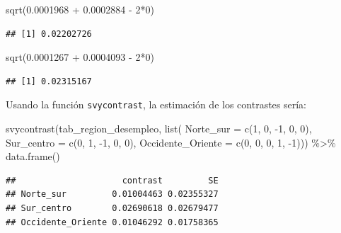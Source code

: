 \documentclass[
  12pt,
]{book}
\newenvironment{Shaded}{\begin{snugshade}}{\end{snugshade}}
\newcommand{\AttributeTok}[1]{\textcolor[rgb]{0.77,0.63,0.00}{#1}}
\newcommand{\DecValTok}[1]{\textcolor[rgb]{0.00,0.00,0.81}{#1}}
\newcommand{\FloatTok}[1]{\textcolor[rgb]{0.00,0.00,0.81}{#1}}
\newcommand{\FunctionTok}[1]{\textcolor[rgb]{0.00,0.00,0.00}{#1}}
\newcommand{\NormalTok}[1]{#1}
\newcommand{\SpecialCharTok}[1]{\textcolor[rgb]{0.00,0.00,0.00}{#1}}
\begin{document}
\begin{Shaded}
\begin{Highlighting}[]
\FunctionTok{sqrt}\NormalTok{(}\FloatTok{0.0001968} \SpecialCharTok{+} \FloatTok{0.0002884} \SpecialCharTok{{-}} \DecValTok{2}\SpecialCharTok{*}\DecValTok{0}\NormalTok{)}
\end{Highlighting}
\end{Shaded}

\begin{verbatim}
## [1] 0.02202726
\end{verbatim}

\begin{Shaded}
\begin{Highlighting}[]
\FunctionTok{sqrt}\NormalTok{(}\FloatTok{0.0001267} \SpecialCharTok{+} \FloatTok{0.0004093} \SpecialCharTok{{-}} \DecValTok{2}\SpecialCharTok{*}\DecValTok{0}\NormalTok{)}
\end{Highlighting}
\end{Shaded}

\begin{verbatim}
## [1] 0.02315167
\end{verbatim}

Usando la función \texttt{svycontrast}, la estimación de los contrastes sería:

\begin{Shaded}
\begin{Highlighting}[]
\FunctionTok{svycontrast}\NormalTok{(tab\_region\_desempleo, }\FunctionTok{list}\NormalTok{(}
                             \AttributeTok{Norte\_sur =} \FunctionTok{c}\NormalTok{(}\DecValTok{1}\NormalTok{, }\DecValTok{0}\NormalTok{, }\SpecialCharTok{{-}}\DecValTok{1}\NormalTok{, }\DecValTok{0}\NormalTok{, }\DecValTok{0}\NormalTok{),}
                             \AttributeTok{Sur\_centro =} \FunctionTok{c}\NormalTok{(}\DecValTok{0}\NormalTok{, }\DecValTok{1}\NormalTok{, }\SpecialCharTok{{-}}\DecValTok{1}\NormalTok{, }\DecValTok{0}\NormalTok{, }\DecValTok{0}\NormalTok{),}
                             \AttributeTok{Occidente\_Oriente =} \FunctionTok{c}\NormalTok{(}\DecValTok{0}\NormalTok{, }\DecValTok{0}\NormalTok{, }\DecValTok{0}\NormalTok{, }\DecValTok{1}\NormalTok{, }\SpecialCharTok{{-}}\DecValTok{1}\NormalTok{))) }\SpecialCharTok{\%\textgreater{}\%} \FunctionTok{data.frame}\NormalTok{()}
\end{Highlighting}
\end{Shaded}

\begin{verbatim}
##                     contrast         SE
## Norte_sur         0.01004463 0.02355327
## Sur_centro        0.02690618 0.02679477
## Occidente_Oriente 0.01046292 0.01758365
\end{verbatim}
\end{document}
